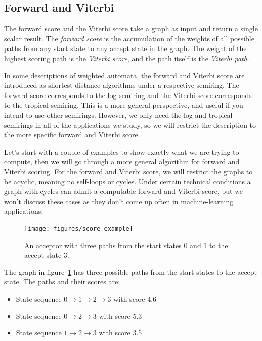 \subsection{Forward and Viterbi}

The forward score and the Viterbi score take a graph as input and return a
single scalar result. The \emph{forward score} is the accumulation of the
weights of all possible paths from any start state to any accept state in the
graph. The weight of the highest scoring path is the \emph{Viterbi score}, and the
path itself is the \emph{Viterbi path}.

\begin{tcolorbox}[colback=white!95!black, colframe=white!45!black,
    sharp corners=all, title=Shortest Distance]
In some descriptions of weighted automata, the forward and Viterbi score are
introduced as shortest distance algorithms under a respective semiring. The
forward score corresponds to the log semiring and the Viterbi score
corresponds to the tropical semiring. This is a more general perspective,
and useful if you intend to use other semirings. However, we only need the
log and tropical semirings in all of the applications we study, so we will
restrict the description to the more specific forward and Viterbi score.
\end{tcolorbox}

Let's start with a couple of examples to show exactly what we are trying to
compute, then we will go through a more general algorithm for forward and
Viterbi scoring. For the forward and Viterbi score, we will restrict the graphs
to be acyclic, meaning no self-loops or cycles. Under certain technical
conditions a graph with cycles can admit a computable forward and Viterbi
score, but we won't discuss these cases as they don't come up often in
machine-learning applications.

\begin{figure}
    \centering
    \texttt{[image: figures/score\_example]}
    \caption{An acceptor with three paths from the start states $0$ and $1$ to
    the accept state $3$.}
    \label{fig:score_example}
\end{figure}

The graph in figure~\ref{fig:score_example} has three possible paths from the
start states to the accept state. The paths and their scores are:

\begin{itemize}
    \item State sequence $0 \rightarrow 1 \rightarrow 2 \rightarrow 3$ with
        score 4.6
    \item State sequence $0 \rightarrow 2 \rightarrow 3$ with score 5.3
    \item State sequence $1 \rightarrow 2 \rightarrow 3$ with score 3.5
\end{itemize}

